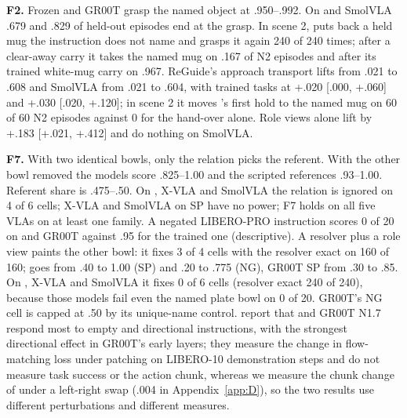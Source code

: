 \textbf{F2.} Frozen \pifive{} and GR00T grasp the named object at .950--.992. On \pizero{} and SmolVLA .679 and .829 of held-out episodes end at the grasp. In scene 2, \pifive{} puts back a held mug the instruction does not name and grasps it again 240 of 240 times; after a clear-away carry it takes the named mug on .167 of N2 episodes and after its trained white-mug carry on .967. ReGuide's approach transport lifts \pizero{} from .021 to .608 and SmolVLA from .021 to .604, with trained tasks at +.020 [.000, +.060] and +.030 [\mi.020, +.120]; in scene 2 it moves \pifive's first hold to the named mug on 60 of 60 N2 episodes against 0 for the hand-over alone. Role views alone lift \pizero{} by +.183 [+.021, +.412] and do nothing on SmolVLA.

\textbf{F7.} With two identical bowls, only the relation picks the referent. With the other bowl removed the models score .825--1.00 and the scripted references .93--1.00. Referent share is .475--.50. On \pizero, X-VLA and SmolVLA the relation is ignored on 4 of 6 cells; X-VLA and SmolVLA on SP have no power; F7 holds on all five VLAs on at least one family. A negated LIBERO-PRO instruction scores 0 of 20 on \pifive{} and GR00T against .95 for the trained one (descriptive). A resolver plus a role view paints the other bowl: it fixes 3 of 4 cells with the resolver exact on 160 of 160; \pifive{} goes from .40 to 1.00 (SP) and .20 to .775 (NG), GR00T SP from .30 to .85. On \pizero, X-VLA and SmolVLA it fixes 0 of 6 cells (resolver exact 240 of 240), because those models fail even the named plate bowl on 0 of 20. GR00T's NG cell is capped at .50 by its unique-name control. \citet{wulff2610} report that \pifive{} and GR00T N1.7 respond most to empty and directional instructions, with the strongest directional effect in GR00T's early layers; they measure the change in flow-matching loss under patching on LIBERO-10 demonstration steps and do not measure task success or the action chunk, whereas we measure the chunk change of \pifive{} under a left-right swap (.004 in Appendix~\ref{app:D}), so the two results use different perturbations and different measures.

